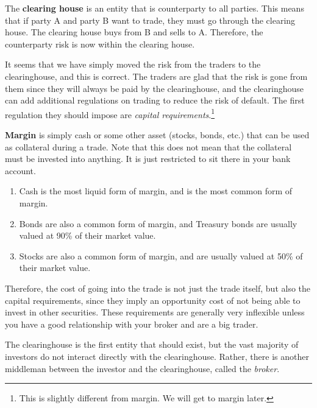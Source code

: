 \documentclass{article}
\begin{document}
    \begin{definition}
      The \textbf{clearing house} is an entity that is counterparty to all parties. This means that if party A and party B want to trade, they must go through the clearing house. The clearing house buys from B and sells to A. Therefore, the counterparty risk is now within the clearing house.
    \end{definition}

    It seems that we have simply moved the risk from the traders to the clearinghouse, and this is correct. The traders are glad that the risk is gone from them since they will always be paid by the clearinghouse, and the clearinghouse can add additional regulations on trading to reduce the risk of default. The first regulation they should impose are \textit{capital requirements}.\footnote{This is slightly different from margin. We will get to margin later. } 

    \begin{definition}[Margin]
      \textbf{Margin} is simply cash or some other asset (stocks, bonds, etc.) that can be used as collateral during a trade. Note that this does not mean that the collateral must be invested into anything. It is just restricted to sit there in your bank account. 
      \begin{enumerate}
        \item Cash is the most liquid form of margin, and is the most common form of margin. 
        \item Bonds are also a common form of margin, and Treasury bonds are usually valued at 90\% of their market value.
        \item Stocks are also a common form of margin, and are usually valued at 50\% of their market value. 
      \end{enumerate}
    \end{definition}

    Therefore, the cost of going into the trade is not just the trade itself, but also the capital requirements, since they imply an opportunity cost of not being able to invest in other securities. These requirements are generally very inflexible unless you have a good relationship with your broker and are a big trader. 

    The clearinghouse is the first entity that should exist, but the vast majority of investors do not interact directly with the clearinghouse. Rather, there is another middleman between the investor and the clearinghouse, called the \textit{broker}. 
\end{document}
